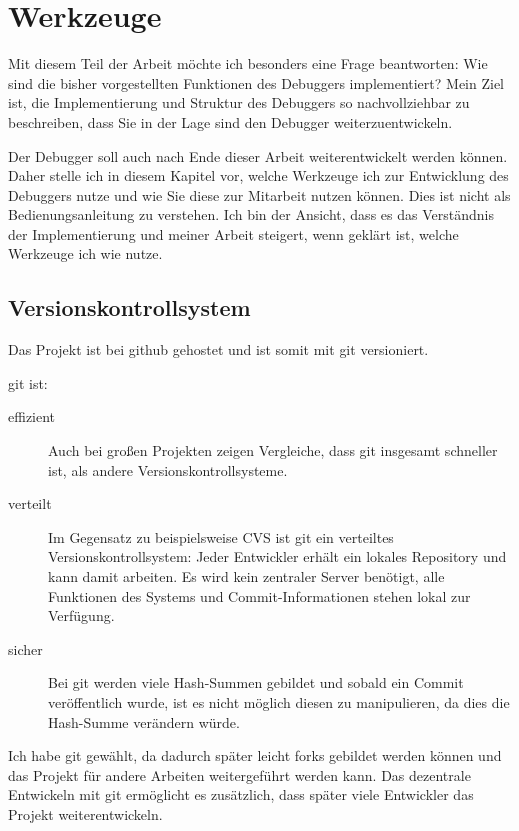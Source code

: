 \chapter{Werkzeuge}
\label{werkzeuge}
Mit diesem Teil der Arbeit möchte ich besonders eine Frage beantworten: Wie sind die bisher vorgestellten Funktionen des Debuggers implementiert? Mein Ziel ist, die Implementierung und Struktur des Debuggers so nachvollziehbar zu beschreiben, dass Sie in der Lage sind den Debugger weiterzuentwickeln.

Der Debugger soll auch nach Ende dieser Arbeit weiterentwickelt werden können. Daher stelle ich in diesem Kapitel vor, welche Werkzeuge ich zur Entwicklung des Debuggers nutze und wie Sie diese zur Mitarbeit nutzen können. Dies ist nicht als Bedienungsanleitung zu verstehen. Ich bin der Ansicht, dass es das Verständnis der Implementierung und meiner Arbeit steigert, wenn geklärt ist, welche Werkzeuge ich wie nutze.

\section{Versionskontrollsystem}
Das Projekt ist bei github %
gehostet und ist somit mit \gls{git} versioniert.

\gls{git} %
ist:
\begin{description}
\item[effizient] Auch bei großen Projekten zeigen Vergleiche, %
dass \gls{git} insgesamt schneller ist, als andere Versionskontrollsysteme.
\item[verteilt] Im Gegensatz zu beispielsweise CVS %
ist \gls{git} ein verteiltes Versionskontrollsystem: Jeder Entwickler erhält ein lokales Repository %
und kann damit arbeiten. Es wird kein zentraler Server benötigt, alle Funktionen des Systems und Commit-Informationen stehen lokal zur Verfügung.
\item[sicher] %
Bei \gls{git} werden viele Hash-Summen gebildet und sobald ein Commit veröffentlich wurde, ist es nicht möglich diesen zu manipulieren, da dies die Hash-Summe %
verändern würde.
\end{description}

Ich habe \gls{git} gewählt, da dadurch später leicht forks %
gebildet werden können und das Projekt für andere Arbeiten weitergeführt werden kann. Das dezentrale Entwickeln mit \gls{git} ermöglicht es zusätzlich, dass später viele Entwickler das Projekt weiterentwickeln.

